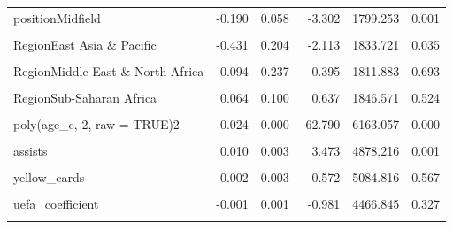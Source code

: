 \documentclass[
  12pt]{article}
\begin{document}
\begin{table}[!h]
\begin{threeparttable}
\begin{tabular}{lrrrrr}
positionMidfield & -0.190 & 0.058 & -3.302 & 1799.253 & 0.001\\
\cellcolor{gray!10}{citizen\_of\_club\_countryYes} & \cellcolor{gray!10}{-0.186} & \cellcolor{gray!10}{0.031} & \cellcolor{gray!10}{-5.905} & \cellcolor{gray!10}{6884.155} & \cellcolor{gray!10}{0.000}\\
RegionEast Asia \& Pacific & -0.431 & 0.204 & -2.113 & 1833.721 & 0.035\\
\addlinespace
\cellcolor{gray!10}{RegionLatin America \& Caribbean} & \cellcolor{gray!10}{0.189} & \cellcolor{gray!10}{0.061} & \cellcolor{gray!10}{3.106} & \cellcolor{gray!10}{1951.968} & \cellcolor{gray!10}{0.002}\\
RegionMiddle East \& North Africa & -0.094 & 0.237 & -0.395 & 1811.883 & 0.693\\
\cellcolor{gray!10}{RegionNorth America} & \cellcolor{gray!10}{-0.066} & \cellcolor{gray!10}{0.217} & \cellcolor{gray!10}{-0.304} & \cellcolor{gray!10}{1854.349} & \cellcolor{gray!10}{0.761}\\
RegionSub-Saharan Africa & 0.064 & 0.100 & 0.637 & 1846.571 & 0.524\\
\cellcolor{gray!10}{poly(age\_c, 2, raw = TRUE)1} & \cellcolor{gray!10}{0.018} & \cellcolor{gray!10}{0.004} & \cellcolor{gray!10}{4.955} & \cellcolor{gray!10}{2294.634} & \cellcolor{gray!10}{0.000}\\
\addlinespace
poly(age\_c, 2, raw = TRUE)2 & -0.024 & 0.000 & -62.790 & 6163.057 & 0.000\\
\cellcolor{gray!10}{goals} & \cellcolor{gray!10}{0.005} & \cellcolor{gray!10}{0.002} & \cellcolor{gray!10}{2.386} & \cellcolor{gray!10}{5164.585} & \cellcolor{gray!10}{0.017}\\
assists & 0.010 & 0.003 & 3.473 & 4878.216 & 0.001\\
\cellcolor{gray!10}{red\_cards} & \cellcolor{gray!10}{0.009} & \cellcolor{gray!10}{0.022} & \cellcolor{gray!10}{0.391} & \cellcolor{gray!10}{4673.660} & \cellcolor{gray!10}{0.696}\\
yellow\_cards & -0.002 & 0.003 & -0.572 & 5084.816 & 0.567\\
\addlinespace
\cellcolor{gray!10}{minutes\_played} & \cellcolor{gray!10}{0.353} & \cellcolor{gray!10}{0.013} & \cellcolor{gray!10}{26.270} & \cellcolor{gray!10}{5239.334} & \cellcolor{gray!10}{0.000}\\
uefa\_coefficient & -0.001 & 0.001 & -0.981 & 4466.845 & 0.327\\
\cellcolor{gray!10}{foreign\_players} & \cellcolor{gray!10}{0.199} & \cellcolor{gray!10}{0.097} & \cellcolor{gray!10}{2.053} & \cellcolor{gray!10}{1972.890} & \cellcolor{gray!10}{0.040}\\

\end{tabular}
\end{threeparttable}
\end{table}
\end{document}
